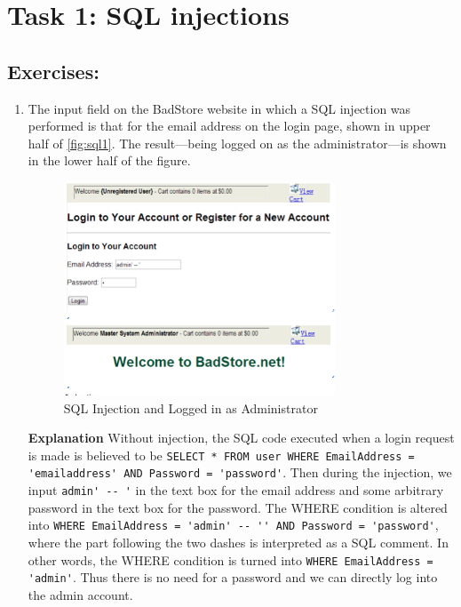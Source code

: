 \section*{Task 1: SQL injections}

\subsection*{Exercises:}
\begin{enumerate}
\item The input field on the BadStore website in which a SQL injection was performed is that for the email address on the login page, shown in upper half of \autoref{fig:sql1}. The result---being logged on as the administrator---is shown in the lower half of the figure.
\begin{figure}[h!]
	\caption{SQL Injection and Logged in as Administrator}
        \label{fig:sql1}
	\centering \includegraphics[height=2.5in]{sqli1}
\end{figure}
  
  \textbf{Explanation} Without injection, the SQL code executed when a login request is made is believed to be \lstinline{SELECT * FROM user WHERE EmailAddress = 'emailaddress' AND Password = 'password'}. Then during the injection, we input \lstinline{admin' -- '} in the text box for the email address and some arbitrary password in the text box for the password. The WHERE condition is altered into \lstinline{WHERE EmailAddress = 'admin' -- '' AND Password = 'password'}, where the part following the two dashes is interpreted as a SQL comment. In other words, the WHERE condition is turned into \lstinline{WHERE EmailAddress = 'admin'}. Thus there is no need for a password and we can directly log into the admin account.


\end{enumerate}
